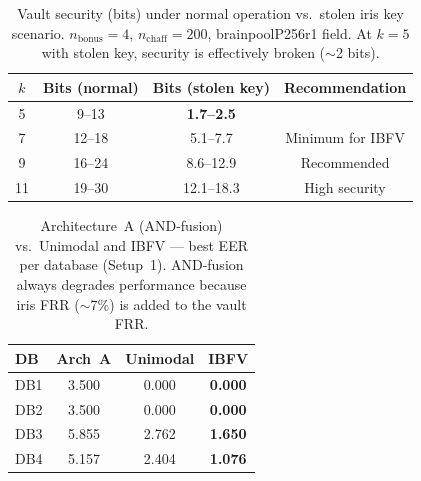 \begin{table}[t]
\centering
\caption{Vault security (bits) under normal operation vs.\ stolen iris key scenario.
$n_\mathrm{bonus} = 4$, $n_\mathrm{chaff} = 200$, brainpoolP256r1 field.
At $k = 5$ with stolen key, security is effectively broken ($\sim$2 bits).}
\label{tab:security}
\begin{tabular}{cccc}
\toprule
$k$ & Bits (normal) & Bits (stolen key) & Recommendation \\
\midrule
5 & 9--13 & \textbf{1.7--2.5} & \color{red}{Insecure if key stolen} \\
7 & 12--18 & 5.1--7.7 & Minimum for IBFV \\
9 & 16--24 & 8.6--12.9 & Recommended \\
11 & 19--30 & 12.1--18.3 & High security \\
\bottomrule
\end{tabular}
\end{table}

\begin{table}[t]
\centering
\caption{Architecture~A (AND-fusion) vs.\ Unimodal and IBFV — best EER per database (Setup~1).
AND-fusion always degrades performance because iris FRR ($\sim$7\%) is added to the vault FRR.}
\label{tab:archa}
\begin{tabular}{lccc}
\toprule
DB & Arch~A & Unimodal & \textbf{IBFV} \\
\midrule
DB1 & 3.500 & 0.000 & \textbf{0.000} \\
DB2 & 3.500 & 0.000 & \textbf{0.000} \\
DB3 & 5.855 & 2.762 & \textbf{1.650} \\
DB4 & 5.157 & 2.404 & \textbf{1.076} \\
\bottomrule
\end{tabular}
\end{table}
